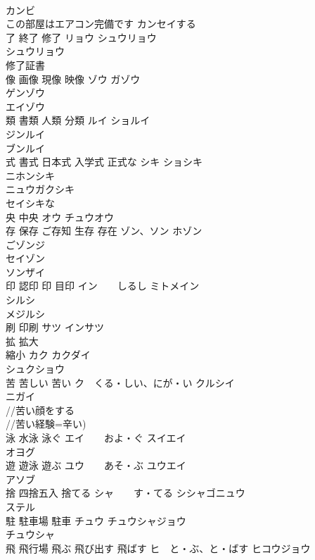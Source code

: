 \documentclass[8pt]{extreport}
\begin{document}
\begin{CJK}{UTF8}{min}
\\	カンビ 
\\	この部屋はエアコン完備です カンセイする 
\\	了 終了 修了	リョウ シュウリョウ 
\\	シュウリョウ 
\\	修了証書
\\	像 画像 現像 映像	ゾウ ガゾウ 
\\	ゲンゾウ 
\\	エイゾウ 
\\	類 書類 人類 分類	ルイ ショルイ 
\\	ジンルイ 
\\	ブンルイ 
\\	式 書式 日本式 入学式 正式な	シキ ショシキ 
\\	ニホンシキ 
\\	ニュウガクシキ 
\\	セイシキな 
\\	央 中央	オウ チュウオウ 
\\	存 保存 ご存知 生存 存在	ゾン、ソン ホゾン　
\\	ごゾンジ 
\\	セイゾン 
\\	ソンザイ 
\\	印 認印 印 目印	イン　　しるし ミトメイン 
\\	シルシ 
\\	メジルシ 
\\	刷 印刷	サツ インサツ 
\\	拡 拡大 
\\	縮小	カク カクダイ 
\\	シュクショウ　
\\	苦 苦しい 苦い	ク　くる・しい、にが・い クルシイ 
\\	ニガイ 
\\	//苦い顔をする 
\\	//苦い経験=辛い)
\\	泳 水泳 泳ぐ	エイ　　およ・ぐ スイエイ 
\\	オヨグ 
\\	遊 遊泳 遊ぶ	ユウ　　あそ・ぶ ユウエイ 
\\	アソブ 
\\	捨 四捨五入 捨てる	シャ　　す・てる シシャゴニュウ 
\\	ステル 
\\	駐 駐車場 駐車	チュウ チュウシャジョウ 
\\	チュウシャ 
\\	飛 飛行場 飛ぶ 飛び出す 飛ばす	ヒ　と・ぶ、と・ばす ヒコウジョウ 

\end{CJK}
\end{document}
